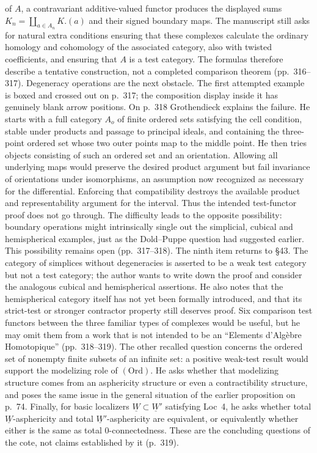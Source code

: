 \documentclass[10pt,oneside]{book}
\begin{document}
of $A$, a contravariant additive-valued functor produces the displayed sums $K_n=\coprod_{a\in A_n}K.(a)$ and their signed boundary maps. The manuscript still asks for natural extra conditions ensuring that these complexes calculate the ordinary homology and cohomology of the associated category, also with twisted coefficients, and ensuring that $A$ is a test category. The formulas therefore describe a tentative construction, not a completed comparison theorem (pp.\ 316--317). Degeneracy operations are the next obstacle. The first attempted example is boxed and crossed out on p.\ 317; the composition display inside it has genuinely blank arrow positions. On p.\ 318 Grothendieck explains the failure. He starts with a full category $A_o$ of finite ordered sets satisfying the cell condition, stable under products and passage to principal ideals, and containing the three-point ordered set whose two outer points map to the middle point. He then tries objects consisting of such an ordered set and an orientation. Allowing all underlying maps would preserve the desired product argument but fail invariance of orientations under isomorphisms, an assumption now recognized as necessary for the differential. Enforcing that compatibility destroys the available product and representability argument for the interval. Thus the intended test-functor proof does not go through. The difficulty leads to the opposite possibility: boundary operations might intrinsically single out the simplicial, cubical and hemispherical examples, just as the Dold--Puppe question had suggested earlier. This possibility remains open (pp.\ 317--318). The ninth item returns to \S43. The category of simplices without degeneracies is asserted to be a weak test category but not a test category; the author wants to write down the proof and consider the analogous cubical and hemispherical assertions. He also notes that the hemispherical category itself has not yet been formally introduced, and that its strict-test or stronger contractor property still deserves proof. Six comparison test functors between the three familiar types of complexes would be useful, but he may omit them from a work that is not intended to be an “Elements d'Algèbre Homotopique” (pp.\ 318--319). The other recalled question concerns the ordered set of nonempty finite subsets of an infinite set: a positive weak-test result would support the modelizing role of $(\mathrm{Ord})$. He asks whether that modelizing structure comes from an asphericity structure or even a contractibility structure, and poses the same issue in the general situation of the earlier proposition on p.\ 74. Finally, for basic localizers $\underline W\subset\underline W'$ satisfying Loc~4, he asks whether total $\underline W$-asphericity and total $\underline W'$-asphericity are equivalent, or equivalently whether either is the same as total 0-connectedness. These are the concluding questions of the cote, not claims established by it (p.\ 319).
\end{document}

